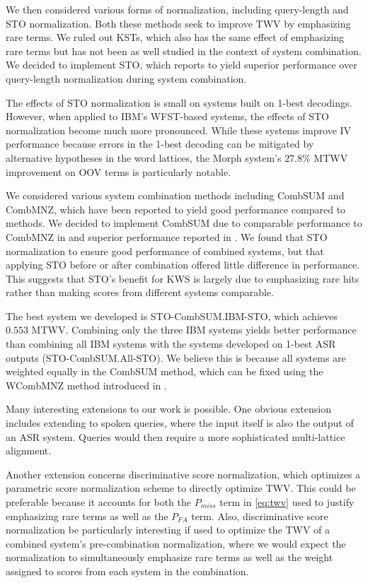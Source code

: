 \documentclass[a4paper,oneside,reqno]{amsart}
\begin{document}
We then considered various forms of normalization, including query-length and
STO normalization\cite{mamou2013system}.  Both these methods seek to improve
TWV by emphasizing rare terms. We ruled out KSTs\cite{wang2014depth}, which
also has the same effect of emphasizing rare terms but has not been as well
studied in the context of system combination. We decided to implement STO,
which \cite{mamou2013system} reports to yield superior performance over
query-length normalization during system combination.

The effects of STO normalization is small on systems built on 1-best decodings.
However, when applied to IBM's WFST-based systems, the effects of STO
normalization become much more pronounced. While these systems improve IV
performance because errors in the 1-best decoding can be mitigated by
alternative hypotheses in the word lattices, the Morph system's $27.8\%$ MTWV
improvement on OOV terms is particularly notable.

We considered various system combination methods including CombSUM and CombMNZ,
which have been reported to yield good performance compared to
methods\cite{lee1997analyses}. We decided to implement CombSUM due to
comparable performance to CombMNZ in \cite{lee1997analyses} and superior
performance reported in \cite{belkin1995combining}. We found that
STO normalization to ensure good performance of combined systems, but that
applying STO before or after combination offered little difference in performance.
This suggests that STO's benefit for KWS is largely due to emphasizing rare hits
rather than making scores from different systems comparable.

The best system we developed is STO-CombSUM.IBM-STO, which achieves $0.553$
MTWV.  Combining only the three IBM systems yields better performance than
combining all IBM systems with the systems developed on 1-best ASR outputs
(STO-CombSUM.All-STO). We believe this is because all systems are weighted
equally in the CombSUM method, which can be fixed using the WCombMNZ method
introduced in \cite{mamou2013system}.

Many interesting extensions to our work is possible. One obvious extension
includes extending to spoken queries, where the input itself is also the
output of an ASR system. Queries would then require a more sophisticated
multi-lattice alignment\cite{lin2008spoken}.

Another extension concerns discriminative score
normalization\cite{xu2014discriminative}, which optimizes a parametric score
normalization scheme to directly optimize TWV. This could be preferable because
it accounts for both the $P_{miss}$ term in \autoref{eq:twv} used to justify
emphasizing rare terms as well as the $P_{FA}$ term. Also, discriminative score
normalization be particularly interesting if used to optimize the TWV of a
combined system's pre-combination normalization, where we would expect the
normalization to simultaneously emphasize rare terms as well as the weight
assigned to scores from each system in the combination.
\end{document}
